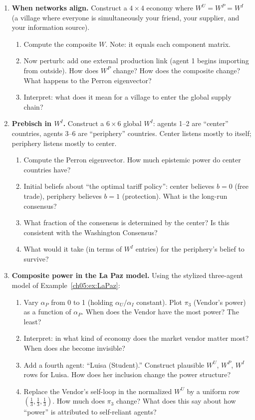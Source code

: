 \documentclass[../structural_economics_book.tex]{subfiles}
\begin{document}
\begin{enumerate}[label=\textbf{5.\arabic*}, leftmargin=3em]
\item \textbf{When networks align.} Construct a $4 \times 4$ economy where $W^U = W^P = W^I$ (a village where everyone is simultaneously your friend, your supplier, and your information source).
\begin{enumerate}
\item Compute the composite $W$. Note: it equals each component matrix.
\item Now perturb: add one external production link (agent 1 begins importing from outside). How does $W^P$ change? How does the composite change? What happens to the Perron eigenvector?
\item Interpret: what does it mean for a village to enter the global supply chain?
\end{enumerate}

\item \textbf{Prebisch in $W^I$.} Construct a $6 \times 6$ global $W^I$: agents 1--2 are ``center'' countries, agents 3--6 are ``periphery'' countries. Center listens mostly to itself; periphery listens mostly to center.
\begin{enumerate}
\item Compute the Perron eigenvector. How much epistemic power do center countries have?
\item Initial beliefs about ``the optimal tariff policy'': center believes $b = 0$ (free trade), periphery believes $b = 1$ (protection). What is the long-run consensus?
\item What fraction of the consensus is determined by the center? Is this consistent with the Washington Consensus?
\item What would it take (in terms of $W^I$ entries) for the periphery's belief to survive?
\end{enumerate}

\item \textbf{Composite power in the La Paz model.} Using the stylized three-agent model of Example~\ref{ch05:ex:LaPaz}:
\begin{enumerate}
\item Vary $\alpha_P$ from 0 to 1 (holding $\alpha_U / \alpha_I$ constant). Plot $\pi_3$ (Vendor's power) as a function of $\alpha_P$. When does the Vendor have the most power? The least?
\item Interpret: in what kind of economy does the market vendor matter most? When does she become invisible?
\item Add a fourth agent: ``Luisa (Student).'' Construct plausible $W^U$, $W^P$, $W^I$ rows for Luisa. How does her inclusion change the power structure?
\item Replace the Vendor's self-loop in the normalized $W^U$ by a uniform row $(\frac13, \frac13, \frac13)$. How much does $\pi_3$ change? What does this say about how ``power'' is attributed to self-reliant agents?
\end{enumerate}


\end{enumerate}
\end{document}

